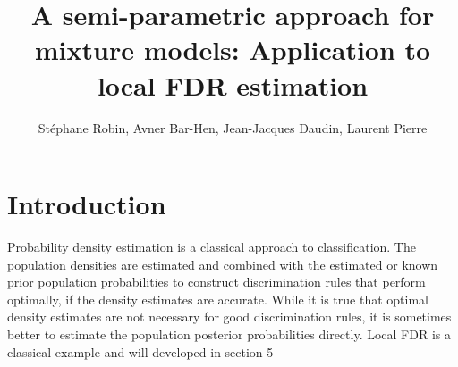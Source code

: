 \documentclass[10pt]{article}
\begin{document}
\pagestyle{empty}
\title{\bf A semi-parametric approach for mixture models:
  Application to  local FDR estimation }

\author{St\'{e}phane Robin, Avner Bar-Hen, Jean-Jacques Daudin,
  Laurent Pierre} 
\date{ }
\maketitle

\pagestyle{empty}

\newpage




\section{Introduction}



Probability density estimation is a classical approach to classification. The population densities are estimated  and combined with the estimated or known
prior population probabilities to construct discrimination rules that perform optimally, if the density estimates are accurate. While it is true that optimal
density estimates are not necessary for good discrimination rules, it is sometimes better to estimate the population posterior probabilities directly. Local
FDR is a classical example and will developed in section 5
\end{document}
